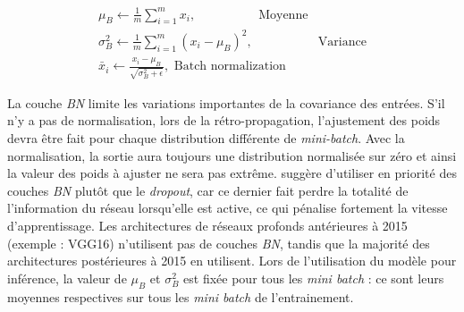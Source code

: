 \begin{equation} \label{eq:batch_norm}
\begin{split}
\mu_{B} \leftarrow \frac{1}{m} \sum_{i=1}^{m} x_{i} , \quad \quad \quad \quad \ \ \ \text{ Moyenne}
\\
\sigma_{B}^{2} \leftarrow \frac{1}{m} \sum_{i=1}^{m}\left(x_{i}-\mu_{B}\right)^{2} , \quad \quad \quad \quad \ \ \ \ \text{  Variance}
\\
\bar{x}_{i} \leftarrow \frac{x_{i}-\mu_{B}}{\sqrt{\sigma_{B}^{2}+\epsilon}} , \text{ Batch normalization} \ 
\end{split}
\end{equation}

La couche \textit{BN} limite les variations importantes de la covariance des entrées. S'il n'y a pas de normalisation, lors de la rétro-propagation, l'ajustement des poids devra être fait pour chaque distribution différente de \textit{mini-batch}.
Avec la normalisation, la sortie aura toujours une distribution normalisée sur zéro et ainsi la valeur des poids à ajuster ne sera pas extrême.
\cite{ioffe_batch_2015} suggère d'utiliser en priorité des couches \textit{BN} plutôt que le \textit{dropout}, car ce dernier fait perdre la totalité de l'information du réseau lorsqu'elle est active, ce qui pénalise fortement la vitesse d'apprentissage.
Les architectures de réseaux profonds antérieures à 2015 (exemple : VGG16) n'utilisent pas de couches \textit{BN}, tandis que la majorité des architectures postérieures à 2015 en utilisent.
Lors de l'utilisation du modèle pour inférence, la valeur de $\mu_{B}$ et $\sigma_B^2$ est fixée pour tous les \textit{mini batch} : ce sont leurs moyennes respectives sur tous les \textit{mini batch} de l'entrainement.


